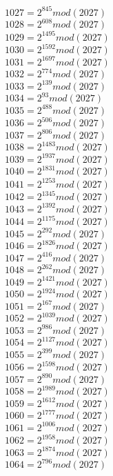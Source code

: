 \documentclass[12pt, letterpaper]{article}
\begin{document}
\begin{itemize}
\begin{multicols}{3}
$1027= 2^{845} mod (2027)$\\
$1028= 2^{608} mod (2027)$\\
$1029= 2^{1495} mod (2027)$\\
$1030= 2^{1592} mod (2027)$\\
$1031= 2^{1697} mod (2027)$\\
$1032= 2^{774} mod (2027)$\\
$1033= 2^{139} mod (2027)$\\
$1034= 2^{93} mod (2027)$\\
$1035= 2^{488} mod (2027)$\\
$1036= 2^{506} mod (2027)$\\
$1037= 2^{806} mod (2027)$\\
$1038= 2^{1483} mod (2027)$\\
$1039= 2^{1937} mod (2027)$\\
$1040= 2^{1831} mod (2027)$\\
$1041= 2^{1253} mod (2027)$\\
$1042= 2^{1345} mod (2027)$\\
$1043= 2^{1392} mod (2027)$\\
$1044= 2^{1175} mod (2027)$\\
$1045= 2^{292} mod (2027)$\\
$1046= 2^{1826} mod (2027)$\\
$1047= 2^{416} mod (2027)$\\
$1048= 2^{262} mod (2027)$\\
$1049= 2^{1421} mod (2027)$\\
$1050= 2^{1924} mod (2027)$\\
$1051= 2^{167} mod (2027)$\\
$1052= 2^{1039} mod (2027)$\\
$1053= 2^{986} mod (2027)$\\
$1054= 2^{1127} mod (2027)$\\
$1055= 2^{399} mod (2027)$\\
$1056= 2^{1598} mod (2027)$\\
$1057= 2^{890} mod (2027)$\\
$1058= 2^{1989} mod (2027)$\\
$1059= 2^{1612} mod (2027)$\\
$1060= 2^{1777} mod (2027)$\\
$1061= 2^{1006} mod (2027)$\\
$1062= 2^{1958} mod (2027)$\\
$1063= 2^{1874} mod (2027)$\\
$1064= 2^{796} mod (2027)$\\

\end{multicols}
\end{itemize}
\end{document}
